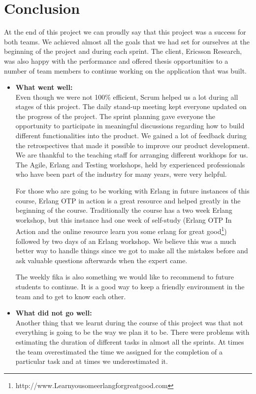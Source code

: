 \section{Conclusion}
At the end of this project we can proudly say that this project was a success for both teams. 
We achieved almost all the goals that we had set for ourselves at the beginning of the project 
and during each sprint. The client, Ericsson Research, was also happy with the performance and 
offered thesis opportunities to a number of team members to continue working on the 
application that was built. 

\begin{itemize}
\item{\textbf{What went well:}}\\
Even though we were not 100\% efficient, Scrum helped us a lot 
during all stages of this project. The daily stand-up meeting kept everyone updated on the 
progress of the project. The sprint planning gave everyone the opportunity 
to participate in meaningful discussions regarding how to build different functionalities into the product. We gained a lot of feedback during the retrospectives that made it possible
to improve our product development. We are thankful to the teaching staff for arranging different workhops for us. 
The Agile, Erlang and Testing workshops, held by experienced professionals who have been part of the 
industry for many years, were very helpful. 

For those who are going to be working with Erlang in future instances of this course, Erlang 
OTP in action is a great resource and helped greatly in the beginning of the course. Traditionally 
the course has a two week Erlang workshop, but this instance had one week of self-study (Erlang OTP In Action and 
the online resource learn you some erlang for great good\footnote{http://www.Learnyousomeerlangforgreatgood.com}) 
followed by two days of an Erlang workshop. We believe this was a much better way to handle things since we got to 
make all the mistakes before and ask valuable questions afterwards when the expert came. 

The weekly fika is also something we would like to recommend to future students to continue. It is a 
good way to keep a friendly environment in the team and to get to know each other.     

\item{\textbf{What did not go well:}}\\ 
Another thing that we learnt during the course of this project was that not everything is going to be 
the way we plan it to be. There were problems with estimating the duration of different tasks in almost all 
the sprints. At times the team overestimated the time we assigned for the completion of a particular task and 
at times we underestimated it. 


\end{itemize}
